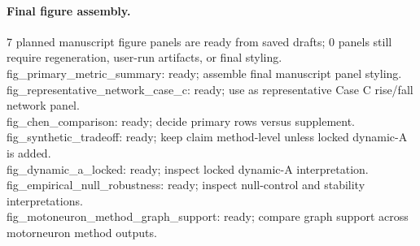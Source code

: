 \paragraph{Final figure assembly.}
7 planned manuscript figure panels are ready from saved drafts; 0 panels still require regeneration, user-run artifacts, or final styling.
\noindent fig\_primary\_metric\_summary: ready; assemble final manuscript panel styling.\\
\noindent fig\_representative\_network\_case\_c: ready; use as representative Case C rise/fall network panel.\\
\noindent fig\_chen\_comparison: ready; decide primary rows versus supplement.\\
\noindent fig\_synthetic\_tradeoff: ready; keep claim method-level unless locked dynamic-A is added.\\
\noindent fig\_dynamic\_a\_locked: ready; inspect locked dynamic-A interpretation.\\
\noindent fig\_empirical\_null\_robustness: ready; inspect null-control and stability interpretations.\\
\noindent fig\_motoneuron\_method\_graph\_support: ready; compare graph support across motorneuron method outputs.\\
